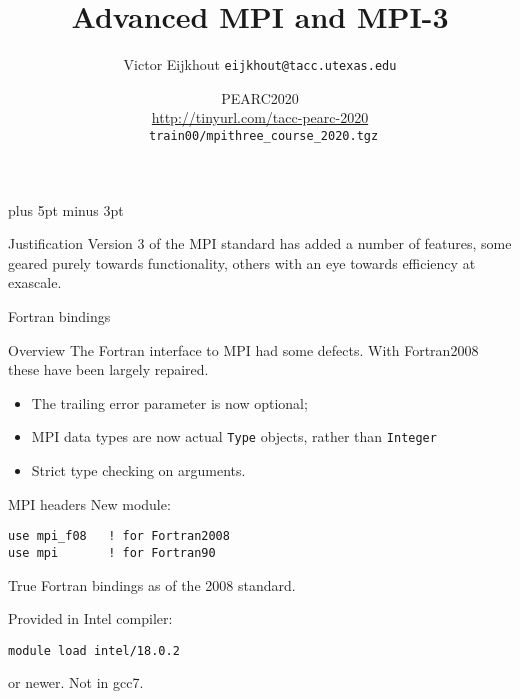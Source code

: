 \documentclass[11pt,headernav]{beamer}
\newcounter{tacc}
\def\Location{}%
\def\courseyear{2020}
\def\Location{TACC APP institute MPI training \courseyear}
\def\Location{TACC/XSEDE MPI training \courseyear}
\def\Location{PEARC2020\\
  \url{http://tinyurl.com/tacc-pearc-2020}\\
  \texttt{\char126 train00/mpithree\_course\_2020.tgz}
}
\newcounter{mpithree}
\begin{document}
\parskip=10pt plus 5pt minus 3pt

\title{Advanced MPI and MPI-3}
\author{Victor Eijkhout {\tt eijkhout@tacc.utexas.edu}}
\date{\Location}

\begin{frame}
  \titlepage
\end{frame}

\begin{xsede}
  
\end{xsede}

\begin{frame}{Justification}
  Version 3 of the MPI standard has added a number
  of features, some geared purely towards functionality,
  others with an eye towards efficiency at exascale.
\end{frame}



\newcommand\coursepart[1]{
  \begin{block}{}
    \setbox0=\hbox to \hsize{\hfil\Huge{#1}\hfil}
    \dimen0=\vsize
    \advance\dimen0 by -\ht0 \advance\dimen0 by -\dp0
    \divide\dimen0 by 2
    \hbox{}
    \vskip \dimen0
    \box0
    \vskip \dimen0
    \hbox{}
  \end{block}
}

 {Fortran bindings}

\lstset{language=Fortran}
\begin{frame}{Overview}
  The Fortran interface to MPI had some defects.
  With Fortran2008 these have been largely repaired.
  \begin{itemize}
  \item The trailing error parameter is now optional;
  \item MPI data types are now actual \lstinline{Type} objects,
    rather than \lstinline{Integer}
  \item Strict type checking on arguments.
  \end{itemize}
\end{frame}

\begin{frame}[containsverbatim]{MPI headers}
\label{sl:mpi-header}
New module:
\begin{verbatim}
use mpi_f08   ! for Fortran2008
use mpi       ! for Fortran90
\end{verbatim}
True Fortran bindings as of the 2008 standard.
\begin{tacc}
Provided in Intel compiler:
\begin{verbatim}
module load intel/18.0.2
\end{verbatim}
or newer. Not in gcc7.
\end{tacc}
\end{frame}
\end{document}
